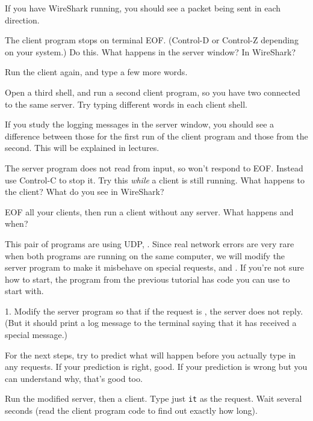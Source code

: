 If you have WireShark running, you should see a packet being sent in each direction.

The client program stops on terminal EOF. (Control-D or Control-Z depending on your
system.) Do this. What happens in the server window? In WireShark?

Run the client again, and type a few more words.

Open a third shell, and run a second client program, so you have two connected to the
same server. Try typing different words in each client shell.

\begin{IMPORTANT}
If you study the logging messages in the server window, you should see a difference
between those for the first run of the client program and those from the second.
This will be explained in lectures.
\end{IMPORTANT}

The server program does not read from input, so won't respond to EOF. Instead use
Control-C to stop it. Try this \emph{while} a client is still running. What happens
to the client? What do you see in WireShark?

EOF all your clients, then run a client without any server. What happens and when?



This pair of programs are using UDP, . Since real
network errors are very rare when both programs are running on the same computer,
we will modify the server program to make it misbehave on special requests,
 and . If you're not sure how to start, the  program
from the previous tutorial has code you can use to start with.

1. Modify the server program so that if the request is , the server does
not reply. (But it should print a log message to the terminal saying that it has
received a special message.)

\begin{IMPORTANT}
For the next steps, try to predict what will happen before you actually type in any
requests. If your prediction is right, good. If your prediction is wrong but you
can understand why, that's good too.
\end{IMPORTANT}

Run the modified server, then a client. Type just \texttt{it} as the request. Wait
several seconds (read the client program code to find out exactly how long).

